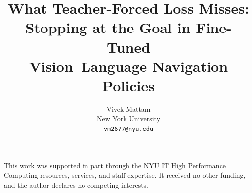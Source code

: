 \documentclass{article}
\title{What Teacher-Forced Loss Misses:\\
Stopping at the Goal in Fine-Tuned\\
Vision--Language Navigation Policies}
\author{%
  Vivek Mattam\\
  New York University\\
  \texttt{vm2677@nyu.edu}
}
\date{}
\begin{document}
\maketitle

\begin{abstract}

\end{abstract}









\begin{ack}
This work was supported in part through the NYU IT High Performance Computing resources,
services, and staff expertise. It received no other funding, and the author declares no competing
interests.
\end{ack}




%
\appendix
\raggedbottom







\end{document}
